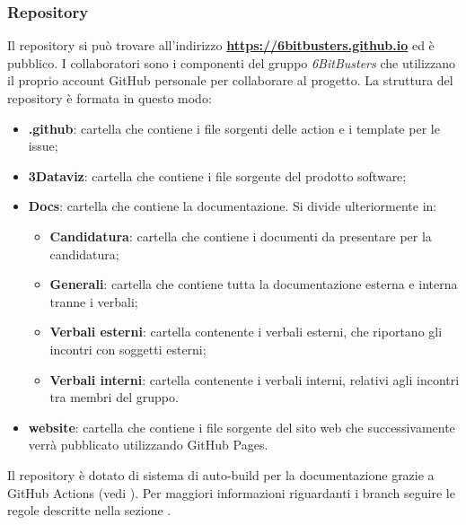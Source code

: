 \subsubsection{Repository}
Il repository si può trovare all'indirizzo
\textbf{\url{https://6bitbusters.github.io}} ed è pubblico. I collaboratori
sono i componenti del gruppo \textit{6BitBusters} che utilizzano il proprio
account GitHub personale per collaborare al progetto. La struttura del
repository è formata in questo modo:
\begin{itemize}
      \item \textbf{ .github}: cartella che contiene i file sorgenti delle action e i template per le issue;
      \item \textbf{3Dataviz}: cartella che contiene i file sorgente del prodotto software;
      \item \textbf{Docs}: cartella che contiene la documentazione. Si divide ulteriormente in:
            \begin{itemize}
                  \item \textbf{Candidatura}: cartella che contiene i documenti da presentare per la candidatura;
                  \item \textbf{Generali}: cartella che contiene tutta la documentazione esterna e interna tranne i verbali;
                  \item \textbf{Verbali esterni}: cartella contenente i verbali esterni, che riportano gli incontri con soggetti esterni;
                  \item \textbf{Verbali interni}: cartella contenente i verbali interni, relativi agli incontri tra membri del gruppo.
            \end{itemize}
      \item \textbf{website}: cartella che contiene i file sorgente del sito web che successivamente verrà pubblicato utilizzando GitHub Pages.
\end{itemize}
Il repository è dotato di sistema di auto-build per la documentazione grazie a GitHub Actions (vedi ).
Per maggiori informazioni riguardanti i branch seguire le regole descritte nella sezione .

